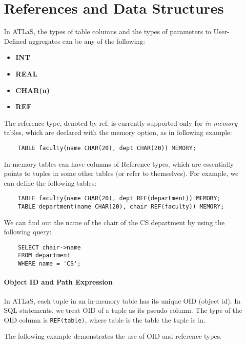 
\section{References and Data Structures}

In ATLaS, the types of table columns and the types of parameters to
User-Defined aggregates can be any of the following:

\begin{itemize}
\item {\bf INT}
\item {\bf REAL}
\item {\bf CHAR(n)}
\item {\bf REF}
\end{itemize}


The reference type, denoted by {\sc ref}, is currently
supported only for {\it in-memory} tables,
which are declared with the {\sc memory} option, as in
following example:

\begin{verbatim}
    TABLE faculty(name CHAR(20), dept CHAR(20)) MEMORY;
\end{verbatim}

In-memory tables can have columns of Reference types, which are
essentially points to tuples in some other tables (or refer to
themselves). For example, we can define the following tables:

\begin{verbatim}
    TABLE faculty(name CHAR(20), dept REF(department)) MEMORY;
    TABLE department(name CHAR(20), chair REF(faculty)) MEMORY;
\end{verbatim}

We can find out the name of the chair of the CS department by using
the following query:

\begin{verbatim}
    SELECT chair->name
    FROM department
    WHERE name = 'CS';
\end{verbatim}
\paragraph{Object ID and Path Expression}
In ATLaS, each tuple in an in-memory table has its unique OID (object
id). In SQL statements, we treat OID of a tuple as its pseudo column.
The type of the OID column is {\tt REF(table)}, where table is the table the
tuple is in.

The following example demonstrates the use of OID and reference types.

